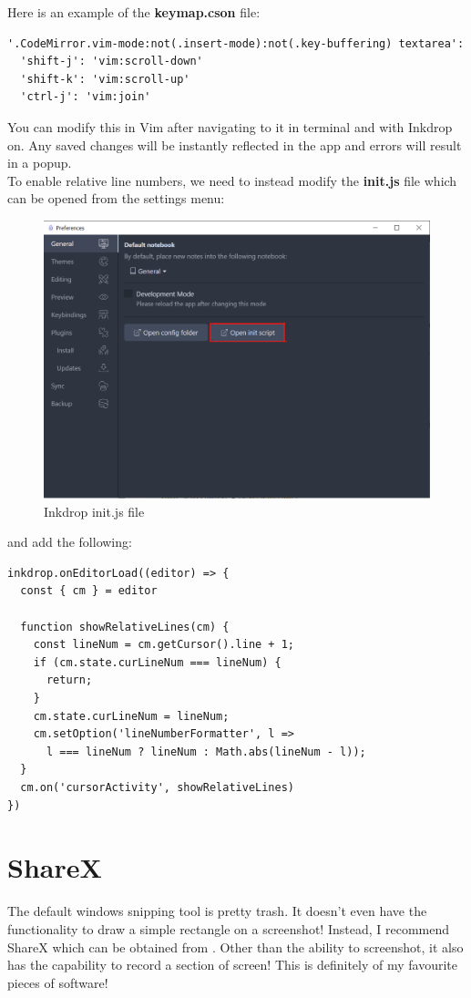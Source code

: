 Here is an example of the \textbf{keymap.cson} file:
\begin{lstlisting}
'.CodeMirror.vim-mode:not(.insert-mode):not(.key-buffering) textarea':
  'shift-j': 'vim:scroll-down'
  'shift-k': 'vim:scroll-up'
  'ctrl-j': 'vim:join'
\end{lstlisting}
You can modify this in Vim after navigating to it in terminal and with Inkdrop
on. Any saved changes will be instantly reflected in the app and errors will
result in a popup.\\

To enable relative line numbers, we need to instead modify the \textbf{init.js}
file which can be opened from the settings menu:
\begin{figure}[H]
    \centering
    \includegraphics[scale=\figscale]{Figures/inkdrop_init_file.png}
    \caption{Inkdrop init.js file}
    \label{FigInkdropInitFile}
\end{figure}
and add the following:
\begin{lstlisting}
inkdrop.onEditorLoad((editor) => {
  const { cm } = editor

  function showRelativeLines(cm) {
    const lineNum = cm.getCursor().line + 1;
    if (cm.state.curLineNum === lineNum) {
      return;
    }
    cm.state.curLineNum = lineNum;
    cm.setOption('lineNumberFormatter', l =>
      l === lineNum ? lineNum : Math.abs(lineNum - l));
  }
  cm.on('cursorActivity', showRelativeLines)
})
\end{lstlisting}

\section{ShareX}
The default windows snipping tool is pretty trash. It doesn't even have the
functionality to draw a simple rectangle on a screenshot! Instead, I recommend
ShareX which can be obtained from \cite{sharex}. Other than the ability to
screenshot, it also has the capability to record a section of screen! This is
definitely of my favourite pieces of software!\\

